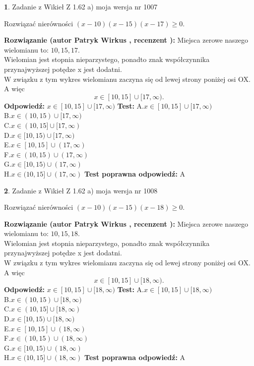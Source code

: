 \documentclass[12pt, a4paper]{article}
\theoremstyle{definition} %
\newtheorem{zad}{}
\newcommand{\zadStart}[1]{\begin{zad}#1\newline}
\newcommand{\zadStop}{\end{zad}}
\newcommand{\rozwStart}[2]{\noindent \textbf{Rozwiązanie (autor #1 , recenzent #2): }\newline}
\newcommand{\rozwStop}{\newline}
\newcommand{\odpStart}{\noindent \textbf{Odpowiedź:}\newline}
\newcommand{\odpStop}{\newline}
\newcommand{\testStart}{\noindent \textbf{Test:}\newline}
\newcommand{\testStop}{\newline}
\newcommand{\kluczStart}{\noindent \textbf{Test poprawna odpowiedź:}\newline}
\newcommand{\kluczStop}{\newline}
\begin{document}
\zadStart{Zadanie z Wikieł Z 1.62 a) moja wersja nr 1007}

Rozwiązać nierówności $(x-10)(x-15)(x-17)\ge0$.
\zadStop
\rozwStart{Patryk Wirkus}{}
Miejsca zerowe naszego wielomianu to: $10, 15, 17$.\\
Wielomian jest stopnia nieparzystego, ponadto znak współczynnika przy\linebreak najwyższej potędze x jest dodatni.\\ W związku z tym wykres wielomianu zaczyna się od lewej strony poniżej osi OX. A więc $$x \in [10,15] \cup [17,\infty).$$
\rozwStop
\odpStart
$x \in [10,15] \cup [17,\infty)$
\odpStop
\testStart
A.$x \in [10,15] \cup [17,\infty)$\\
B.$x \in (10,15) \cup [17,\infty)$\\
C.$x \in (10,15] \cup [17,\infty)$\\
D.$x \in [10,15) \cup [17,\infty)$\\
E.$x \in [10,15] \cup (17,\infty)$\\
F.$x \in (10,15) \cup (17,\infty)$\\
G.$x \in [10,15) \cup (17,\infty)$\\
H.$x \in (10,15] \cup (17,\infty)$
\testStop
\kluczStart
A
\kluczStop



\zadStart{Zadanie z Wikieł Z 1.62 a) moja wersja nr 1008}

Rozwiązać nierówności $(x-10)(x-15)(x-18)\ge0$.
\zadStop
\rozwStart{Patryk Wirkus}{}
Miejsca zerowe naszego wielomianu to: $10, 15, 18$.\\
Wielomian jest stopnia nieparzystego, ponadto znak współczynnika przy\linebreak najwyższej potędze x jest dodatni.\\ W związku z tym wykres wielomianu zaczyna się od lewej strony poniżej osi OX. A więc $$x \in [10,15] \cup [18,\infty).$$
\rozwStop
\odpStart
$x \in [10,15] \cup [18,\infty)$
\odpStop
\testStart
A.$x \in [10,15] \cup [18,\infty)$\\
B.$x \in (10,15) \cup [18,\infty)$\\
C.$x \in (10,15] \cup [18,\infty)$\\
D.$x \in [10,15) \cup [18,\infty)$\\
E.$x \in [10,15] \cup (18,\infty)$\\
F.$x \in (10,15) \cup (18,\infty)$\\
G.$x \in [10,15) \cup (18,\infty)$\\
H.$x \in (10,15] \cup (18,\infty)$
\testStop
\kluczStart
A
\kluczStop
\end{document}
